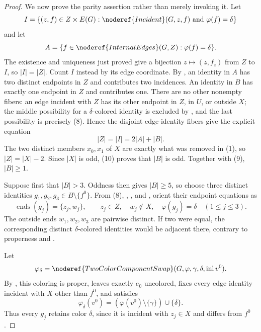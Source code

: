\begin{proof}
We now prove the parity assertion rather than merely invoking it.  Let
\[
 I=\{(z,f)\in Z\times E(G):
       \noderef{Incident}(G,z,f)\text{ and }\varphi(f)=\delta\}
\]
and let
\[
 A=\{f\in\noderef{InternalEdges}(G,Z):\varphi(f)=\delta\}.
\]
The existence and uniqueness just proved give a bijection
$z\mapsto(z,f_z)$ from $Z$ to $I$, so $|I|=|Z|$.  Count $I$ instead by
its edge coordinate.  By , an identity in
$A$ has two distinct endpoints in $Z$ and contributes two incidences.
An identity in $B$ has exactly one endpoint in $Z$ and contributes one.
There are no other nonempty fibers: an edge incident with $Z$ has its
other endpoint in $Z$, in $U$, or outside $X$; the middle possibility
for a $\delta$-colored identity is excluded by
, and the last possibility is precisely
(8).  Hence the disjoint edge-identity fibers give the explicit equation
\[
 |Z|=|I|=2|A|+|B|.                                           \tag{10}
\]
The two distinct members $x_0,x_1$ of $X$ are exactly what was removed
in (1), so $|Z|=|X|-2$.  Since $|X|$ is odd, (10) proves that $|B|$ is
odd.  Together with (9), $|B|\ge1$.

Suppose first that $|B|>3$.  Oddness then gives $|B|\ge5$, so choose
three distinct identities $g_1,g_2,g_3\in B\setminus\{f^0\}$.  From
(8), , , and
,
orient their endpoint equations as
\[
 \operatorname{ends}(g_j)=\{z_j,w_j\},\qquad
 z_j\in Z,\quad w_j\notin X,\quad \varphi(g_j)=\delta
 \quad(1\le j\le3).                                        \tag{11}
\]
The outside ends $w_1,w_2,w_3$ are pairwise distinct.  If two were equal,
the corresponding distinct $\delta$-colored identities would be adjacent
there, contrary to properness and .

Let
\[
 \varphi_\delta=\noderef{TwoColorComponentSwap}
   (G,\varphi,\gamma,\delta,\operatorname{inl}v^0).
\]
By , this coloring is proper,
leaves exactly $e_0$ uncolored, fixes every edge identity incident with
$X$ other than $f^0$, and satisfies
\[
 \overline{\varphi_\delta}(v^0)=
   (\overline\varphi(v^0)\setminus\{\gamma\})\cup\{\delta\}.
\tag{12}
\]
Thus every $g_j$ retains color $\delta$, since it is incident with
$z_j\in X$ and differs from $f^0$.


\end{proof}

